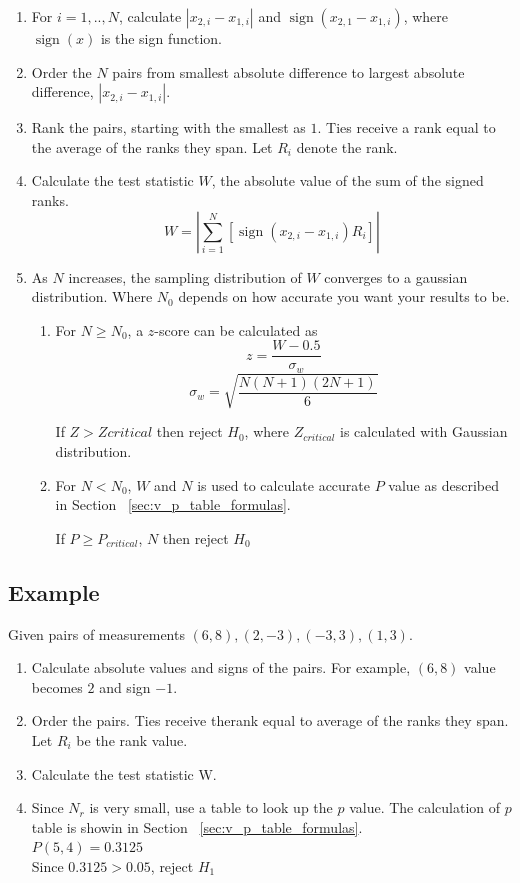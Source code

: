 \documentclass[12pt]{article}
\DeclareMathOperator{\sign}{sign}
\begin{document}
\begin{enumerate}
\item
For $i=1, .., N$, calculate $|x_{2,i} - x_{1,i}|$ and $\sign(x_{2,1} - x_{1,i})$, where $\sign(x)$ is the sign function.
\item
Order the $N$ pairs from smallest absolute difference to largest absolute difference, $|x_{2,i} - x_{1,i}|$.
\item
Rank the pairs, starting with the smallest as $1$. Ties receive a rank equal to the average of the ranks they span. Let $R_i$ denote the rank.
\item
Calculate the test statistic $W$, the absolute value of the sum of the signed ranks.
\begin{equation}
  W= \left|  \sum\limits_{i=1}^{N} \left[ \sign(x_{2,i} - x_{1,i})R_i \right] \right|
\end{equation}

\item
As $N$ increases, the sampling distribution of $W$ converges to a gaussian distribution. Where $N_0$ depends on how accurate you want your results to be.
\begin{enumerate}
\item
For $N \geq N_0$, a $z$-score can be calculated as
\begin{equation}
  z=\frac{W-0.5}{\sigma_w}
\end{equation}
\begin{equation}
  \sigma_w = \sqrt{\frac{N(N + 1)(2N + 1)}{6}}
\end{equation}

If $Z > Zcritical$ then reject $H_0$, where $Z_{critical}$ is calculated with Gaussian distribution.

\item
For $N < N_0$, $W$ and $N$ is used to calculate accurate $P$ value as described in Section ~\ref{sec:v_p_table_formulas}.

If $ P \geq P_{critical}$, $N$ then reject $H_0$
\end{enumerate}
\end{enumerate}

\subsection{Example}
Given pairs of measurements $(6, 8), (2, -3), (-3, 3), (1, 3)$.

\begin{enumerate}
\item Calculate absolute values and signs of the pairs. For example, $(6, 8)$ value becomes $2$ and sign $-1$.
\item Order the pairs. Ties receive therank equal to average of the ranks they span. Let $R_i$ be the rank value.
\item Calculate the test statistic W.
\item Since $N_r$ is very small, use a table to look up the $p$ value. The calculation of $p$ table is showin in Section ~\ref{sec:v_p_table_formulas}. \\
$P(5, 4) = 0.3125$ \\
Since $0.3125 > 0.05$, reject $H_1$
\end{enumerate}
\end{document}
